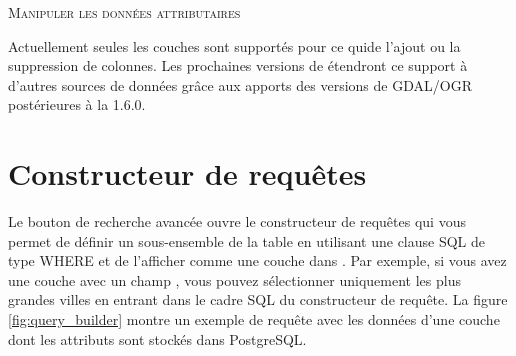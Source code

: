 \begin{Tip}[ht]\caption{\textsc{Manipuler les données attributaires}}
Actuellement seules les couches \pg sont supportés pour ce quide l'ajout ou la suppression de colonnes. Les prochaines versions de \qg étendront ce support à d'autres sources de données grâce aux apports des versions de GDAL/OGR postérieures à la 1.6.0.
\end{Tip}

\section{Constructeur de requêtes}\label{sec:query_builder}


Le bouton de recherche avancée ouvre le constructeur de requêtes qui vous permet de définir un sous-ensemble de la table en utilisant une clause SQL de type WHERE et de l'afficher comme une couche dans \qg. Par exemple, si vous avez une couche  avec un champ , vous pouvez sélectionner uniquement les plus grandes villes en entrant  dans le cadre SQL du constructeur de requête. La figure \ref{fig:query_builder} montre un exemple de requête avec les données d'une couche \pg dont les attributs sont stockés dans PostgreSQL.

